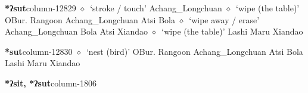   \item {\footnotesize \textbf{*ʔsut}}{\tiny column-12829}
         $\diamond$~`stroke / touch'
         Achang\_Longchuan 
\hspace{1ex}
         $\diamond$~`wipe (the table)'
         OBur. 
\hspace{1ex}
         Rangoon 
\hspace{1ex}
         Achang\_Longchuan 
\hspace{1ex}
         Atsi 
\hspace{1ex}
         Bola 
\hspace{1ex}
         $\diamond$~`wipe away / erase'
         Achang\_Longchuan 
\hspace{1ex}
         Bola 
\hspace{1ex}
         Atsi 
\hspace{1ex}
         Xiandao 
\hspace{1ex}
         $\diamond$~`wipe (the table)'
         Lashi 
\hspace{1ex}
         Maru 
\hspace{1ex}
         Xiandao 
  \item {\footnotesize \textbf{*sut}}{\tiny column-12830}
         $\diamond$~`nest (bird)'
         OBur. 
\hspace{1ex}
         Rangoon 
\hspace{1ex}
         Achang\_Longchuan 
\hspace{1ex}
         Atsi 
\hspace{1ex}
         Bola 
\hspace{1ex}
         Lashi 
\hspace{1ex}
         Maru 
\hspace{1ex}
         Xiandao 
  \item {\footnotesize \textbf{*ʔsit, *ʔsut}}{\tiny column-1806}
